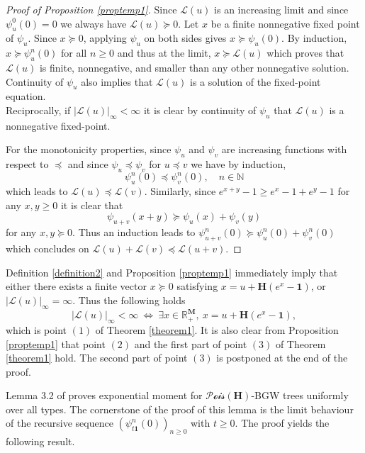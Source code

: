 \documentclass[reqno,final,11pt]{amsart}
\renewcommand{\cite}{\citet}
\theoremstyle{plain}
\theoremstyle{definition}
\theoremstyle{remark}
\newcommand{\R}{\mathds{R}}
\newcommand{\N}{\mathds{N}}
\newcommand{\M}{\bm{M}}
\renewcommand{\L}{\bm{\mathscr{L}}}
\newcommand{\ones}{\bm{1}}
\renewcommand{\H}{\bm{H}}
\newcommand{\pos}{\R_+^{\M}}
\newcommand{\Pois}{\mathscr{P}\!\mathscr{o}\!\mathscr{i}\!\mathscr{s}}
\begin{document}
\begin{proof}[Proof of Proposition \ref{proptemp1}]
    Since $\L(u)$ is an increasing limit and since $\psi^0_u(0) = 0$ we always have $\L(u)\succeq 0$. Let $x$ be a finite nonnegative fixed point of $\psi_u$. Since $x \succeq 0$, applying $\psi_{u}$ on both sides gives $x \succeq \psi_{u}(0)$. By induction, $x \succeq \psi_{u}^n(0)$ for all $n\geq 0$ and thus at the limit, $x \succeq \L(u)$ which proves that $\L(u)$ is finite, nonnegative, and smaller than any other nonnegative solution. Continuity of $\psi_u$ also implies that $\L(u)$ is a solution of the fixed-point equation.\\
    Reciprocally, if $\vert \L(u)\vert_{\infty} < \infty$ it is clear by continuity of $\psi_{u}$ that $\L(u)$ is a nonnegative fixed-point.
    
    For the monotonicity properties, since $\psi_{u}$ and $\psi_{v}$ are increasing functions with respect to $\preceq$ and since $\psi_{u} \preceq \psi_{v}$ for $u\preceq v$ we have by induction,
    \[ \psi^n_{u}(0) \preceq \psi^n_{v}(0), \quad n\in\N\]
    which leads to $\L(u) \preceq \L(v)$.
    Similarly, since $e^{x+y}-1 \geq e^x-1 + e^y-1$ for any $x,y\geq 0$ it is clear that 
    \[\psi_{u+v}(x+y) \succeq \psi_u(x) + \psi_v(y)\]
    for any $x,y\succeq 0$. Thus an induction leads to $\psi_{u+v}^n(0) \succeq \psi_u^n(0) + \psi_v^n(0)$ which concludes on $\L(u)+\L(v) \preceq \L(u+v)$.
\end{proof}

Definition \ref{definition2} and Proposition \ref{proptemp1} immediately imply that either there exists a finite vector $x\succeq0$ satisfying $x=u+\H(e^x-\ones)$, or $\vert\L(u)\vert_\infty=\infty$. Thus the following holds
\begin{equation}
        \vert \L(u)\vert_{\infty} < \infty \ \Longleftrightarrow \ \exists x\in\pos, \ x = u+\H(e^x-\ones),
\end{equation}
which is point $(1)$ of Theorem \ref{theorem1}. It is also clear from Proposition \ref{proptemp1} that point $(2)$ and the first part of point $(3)$ of Theorem \ref{theorem1} hold. The second part of point $(3)$ is postponed at the end of the proof.

Lemma 3.2 of \cite{leblanc_exponential_2024} proves exponential moment for $\Pois(\H)$-BGW trees uniformly over all types. The cornerstone of the proof of this lemma is the limit behaviour of the recursive sequence $(\psi^n_{t\ones}(0))_{n\geq 0}$ with $t\geq 0$. The proof yields the following result.
\end{document}
